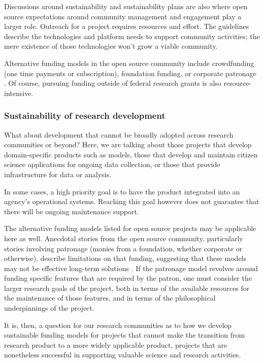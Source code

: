 \documentclass{article}
\begin{document}
Discussions around sustainability and sustainability plans are also where open source expectations around community management and engagement play a larger role. Outreach for a project requires resources and effort. The guidelines describe the technologies and platform needs to support community activities; the mere existence of those technologies won’t grow a viable community. 
 
Alternative funding models in the open source community include crowdfunding (one time payments or subscription), foundation funding, or corporate patronage \autocite{eghbal_roads_2016}. Of course, pursuing funding outside of federal research grants is also resource-intensive. 

\subsubsection{Sustainability of research development}
What about development that cannot be broadly adopted across research communities or beyond? Here, we are talking about those projects that develop domain-specific products such as models, those that develop and maintain citizen science applications for ongoing data collection, or those that provide infrastructure for data or analysis.
 
In some cases, a high priority goal is to have the product integrated into an agency’s operational systems. Reaching this goal however does not guarantee that there will be ongoing maintenance support.
 
The alternative funding models listed for open source projects may be applicable here as well. Anecdotal stories from the open source community, particularly stories involving patronage (monies from a foundation, whether corporate or otherwise), describe limitations on that funding, suggesting that these models may not be effective long-term solutions \autocite{eghbal_roads_2016}. If the patronage model revolves around funding specific features that are required by the patron, one must consider the larger research goals of the project, both in terms of the available resources for the maintenance of those features, and in terms of the philosophical underpinnings of the project. 
 
It is, then, a question for our research communities as to how we develop sustainable funding models for projects that cannot make the transition from research product to a more widely applicable product, projects that are nonetheless successful in supporting valuable science and research activities.
 
\end{document}
